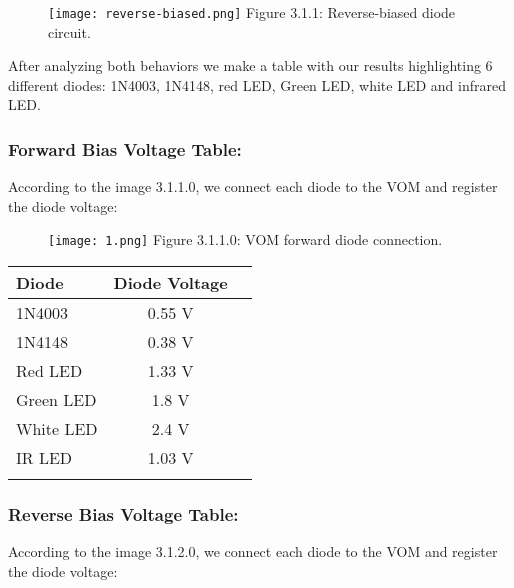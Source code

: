 \documentclass[10pt,a4paper]{article}
\begin{document}
\begin{figure}[H]
\texttt{[image: reverse-biased.png]}
\centering \linebreak Figure 3.1.1: Reverse-biased diode circuit.
\end{figure}

After analyzing both behaviors we make a table with our results highlighting 6 different diodes: 1N4003, 1N4148, red LED, Green LED, white LED and infrared LED. 

\subsubsection{Forward Bias Voltage Table:}

According to the image 3.1.1.0, we connect each diode to the VOM and register the diode voltage:

\begin{multicols}{2}

\begin{figure}[H]
\texttt{[image: 1.png]}
\centering \linebreak \linebreak Figure 3.1.1.0: VOM forward diode connection.
\end{figure}

\begin{center}
\begin{tabular}[.5cm]{l c c }
\toprule
Diode & Diode Voltage \\
\midrule
1N4003 & 0.55 V \\
\cmidrule{1-2}
1N4148 & 0.38 V \\
\cmidrule{1-2}
Red LED & 1.33 V \\
\cmidrule{1-2}
Green LED & 1.8 V \\
\cmidrule{1-2}
White LED & 2.4 V \\
\cmidrule{1-2}
IR LED & 1.03 V \\
\bottomrule
\linebreak
\end{tabular}
\end{center} 

\end{multicols}

\subsubsection{Reverse Bias Voltage Table:}

According to the image 3.1.2.0, we connect each diode to the VOM and register the diode voltage:
\end{document}
